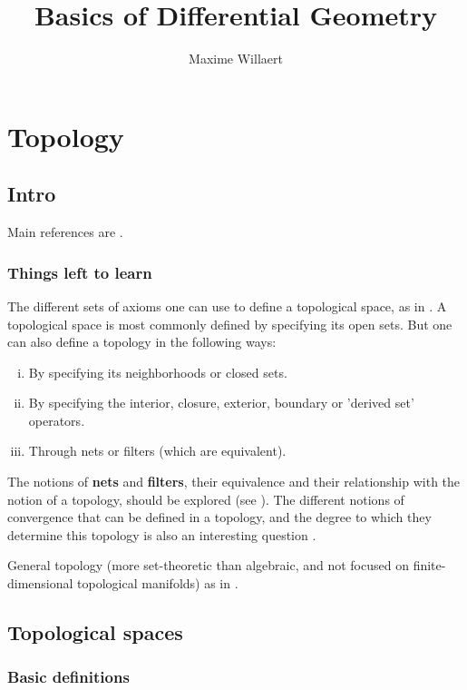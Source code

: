\documentclass[a4paper,12pt,parskip=half*,chapterprefix=true,numbers=noendperiod]{scrreprt}
\title{Basics of Differential Geometry}
\author{Maxime Willaert}
\theoremstyle{definition}
\theoremstyle{remark}
\begin{document}
\maketitle

\tableofcontents

\part{Topology}

\chapter{Intro}

Main references are \cite{Munkres:Top,Lee:IntTopMan}.

\section{Things left to learn}

The different sets of axioms one can use to define a topological space, as in \cite{Wiki:AxiomTop}. A topological space is most commonly defined by specifying its open sets. But one can also define a topology in the following ways:
\begin{enumerate}[(i)]
	\item By specifying its neighborhoods or closed sets.
	\item By specifying the interior, closure, exterior, boundary or 'derived set' operators.
	\item Through nets or filters (which are equivalent).
\end{enumerate}
The notions of \textbf{nets} and \textbf{filters}, their equivalence and their relationship with the notion of a topology, should be explored (see \cite{Wiki:FiltersTop}). The different notions of convergence that can be defined in a topology, and the degree to which they determine this topology is also an interesting question \cite{Wiki:SequentialSpace,Wiki:ConvergenceSpace}.

General topology (more set-theoretic than algebraic, and not focused on finite-dimensional topological manifolds) as in \cite{Munkres:Top}.

\chapter{Topological spaces}

\section{Basic definitions}
\end{document}
